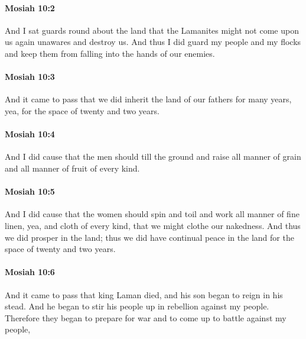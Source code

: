 		\paragraph{Mosiah 10:2} %
			\label{MOSIAH-10-2}

			And I sat guards round about the land
			that the Lamanites might not come upon us again unawares and destroy us.
			And thus I did guard my people and my flocks
			and keep them from falling into the hands of our enemies.

		\paragraph{Mosiah 10:3} %
			\label{MOSIAH-10-3}

			And it came to pass that we did inherit the land of our fathers for many years,
			yea, for the space of twenty and two years.

		\paragraph{Mosiah 10:4} %
			\label{MOSIAH-10-4}

			And I did cause that the men should till the ground
			and raise all manner of grain and all manner of fruit of every kind.

		\paragraph{Mosiah 10:5} %
			\label{MOSIAH-10-5}

			And I did cause that the women should spin and toil
			and work all manner of fine linen,
			yea, and cloth of every kind,
			that we might clothe our nakedness.
			And thus we did prosper in the land;
			thus we did have continual peace in the land
			for the space of twenty and two years.

		\paragraph{Mosiah 10:6} %
			\label{MOSIAH-10-6}

			And it came to pass that king Laman died,
			and his son began to reign in his stead.
			And he began to stir his people up in rebellion against my people.
			Therefore they began to prepare for war
			and to come up to battle against my people,

